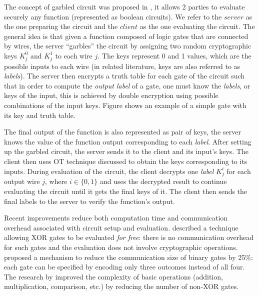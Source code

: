 % 

The concept of garbled circuit was proposed in , it allows 2 parties to evaluate securely any function (represented
as boolean circuits). We refer to the \(server\) as the one preparing the
circuit and the \(client\) as the one evaluating the circuit. The general idea
is that given a function composed of logic gates that are connected by wires,
the server ``garbles'' the circuit by assigning two random cryptographic keys
\(K_{j}^{0}\) and \(K_{j}^{1}\) to each wire \(j\). The keys represent 0 and 1
values, which are the possible inputs to each wire (in related literature, keys
are also referred to as \textit{labels}).  The server then encrypts a truth table
for each gate of the circuit such that in order to compute the \textit{output
  label } of a gate, one must know the \textit{labels}, or keys of the input,
this is achieved by double encryption using possible combinations of the input
keys. Figure \missref{} shows an example of a simple gate with its key and truth
table.

The final output of the function is also represented as pair of keys, the server
knows the value of the function output corresponding to each
\textit{label}. After setting up the garbled circuit, the server sends it to the
client and its input's keys. The client then uses OT technique discussed to
obtain the keys corresponding to its inputs. During evaluation of the circuit, the
client decrypts one \textit{label} \(K_{j}^{i}\) for each output wire \(j\),
where \(i \in \{0,1\}\) and uses the decrypted result to continue evaluating the
circuit until it gets the final keys of it. The client then sends the
final labels to the server to verify the function's output.

Recent improvements reduce both computation time and communication overhead
associated with circuit setup and evaluation. 
described a technique allowing XOR gates to be evaluated \textit{for free}:
there is no communication overhead for such gates and the evaluation does not
involve cryptographic operations.  proposed a
mechanism to reduce the communication size of binary gates by 25\%: each gate
can be specified by encoding only three outcomes instead of all four. The
research by  improved the complexity of basic
operations (addition, multiplication, comparison, etc.) by reducing the number of
non-XOR gates.



